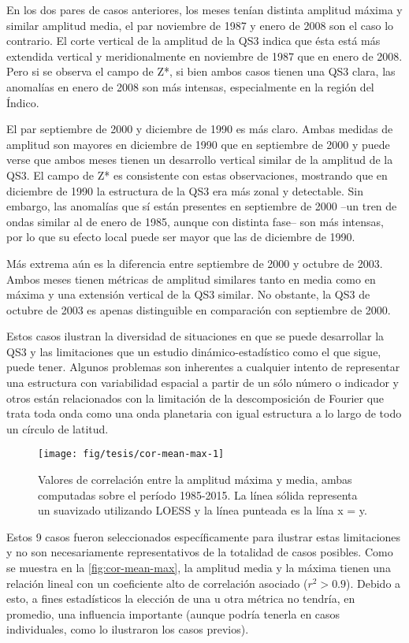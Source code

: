 \documentclass[spanish,a4paper,12p]{book}
\begin{document}
En los dos pares de casos anteriores, los meses tenían distinta amplitud
máxima y similar amplitud media, el par noviembre de 1987 y enero de
2008 son el caso lo contrario. El corte vertical de la amplitud de la
QS3 indica que ésta está más extendida vertical y meridionalmente en
noviembre de 1987 que en enero de 2008. Pero si se observa el campo de
Z*, si bien ambos casos tienen una QS3 clara, las anomalías en enero de
2008 son más intensas, especialmente en la región del Índico.

El par septiembre de 2000 y diciembre de 1990 es más claro. Ambas
medidas de amplitud son mayores en diciembre de 1990 que en septiembre
de 2000 y puede verse que ambos meses tienen un desarrollo vertical
similar de la amplitud de la QS3. El campo de Z* es consistente con
estas observaciones, mostrando que en diciembre de 1990 la estructura de
la QS3 era más zonal y detectable. Sin embargo, las anomalías que sí
están presentes en septiembre de 2000 --un tren de ondas similar al de
enero de 1985, aunque con distinta fase-- son más intensas, por lo que
su efecto local puede ser mayor que las de diciembre de 1990.

Más extrema aún es la diferencia entre septiembre de 2000 y octubre de
2003. Ambos meses tienen métricas de amplitud similares tanto en media
como en máxima y una extensión vertical de la QS3 similar. No obstante,
la QS3 de octubre de 2003 es apenas distinguible en comparación con
septiembre de 2000.

Estos casos ilustran la diversidad de situaciones en que se puede
desarrollar la QS3 y las limitaciones que un estudio
dinámico-estadístico como el que sigue, puede tener. Algunos problemas
son inherentes a cualquier intento de representar una estructura con
variabilidad espacial a partir de un sólo número o indicador y otros
están relacionados con la limitación de la descomposición de Fourier que
trata toda onda como una onda planetaria con igual estructura a lo largo
de todo un círculo de latitud.

\begin{figure*}
\texttt{[image: fig/tesis/cor-mean-max-1]} \caption{Valores de correlación entre la amplitud máxima y media, ambas computadas sobre el período 1985-2015. La línea sólida representa un suavizado utilizando LOESS y la línea punteada es la lína x = y.}\label{fig:cor-mean-max}
\end{figure*}

Estos 9 casos fueron seleccionados específicamente para ilustrar estas
limitaciones y no son necesariamente representativos de la totalidad de
casos posibles. Como se muestra en la \autoref{fig:cor-mean-max}, la
amplitud media y la máxima tienen una relación lineal con un coeficiente
alto de correlación asociado (\(r^2>0.9\)). Debido a esto, a fines
estadísticos la elección de una u otra métrica no tendría, en promedio,
una influencia importante (aunque podría tenerla en casos individuales,
como lo ilustraron los casos previos).
\end{document}
